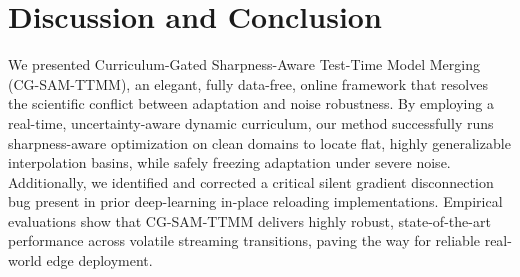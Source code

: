\documentclass{article}
\theoremstyle{plain}
\theoremstyle{definition}
\theoremstyle{remark}
\begin{document}
\section{Discussion and Conclusion}
\label{sec:conclusion}
We presented Curriculum-Gated Sharpness-Aware Test-Time Model Merging (CG-SAM-TTMM), an elegant, fully data-free, online framework that resolves the scientific conflict between adaptation and noise robustness. By employing a real-time, uncertainty-aware dynamic curriculum, our method successfully runs sharpness-aware optimization on clean domains to locate flat, highly generalizable interpolation basins, while safely freezing adaptation under severe noise. Additionally, we identified and corrected a critical silent gradient disconnection bug present in prior deep-learning in-place reloading implementations. Empirical evaluations show that CG-SAM-TTMM delivers highly robust, state-of-the-art performance across volatile streaming transitions, paving the way for reliable real-world edge deployment.
\end{document}

